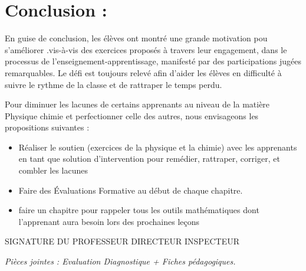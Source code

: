 \documentclass[12pt]{article}
\begin{document}
\section*{Conclusion : }
\hspace{2cm}En guise de conclusion, les élèves ont  montré  une grande motivation  pou s’améliorer .vis-à-vis des exercices proposés à travers leur engagement, dans le processus de l’enseignement-apprentissage, manifesté par des participations jugées remarquables. Le défi est toujours relevé afin d’aider les élèves en difficulté à suivre le rythme de la classe et de rattraper le temps perdu.

 Pour diminuer les lacunes de certains apprenants au niveau de la matière Physique chimie et perfectionner celle des autres, nous envisageons les propositions suivantes : 
 \begin{itemize}
	 \item Réaliser le soutien (exercices de la physique et la chimie) avec les apprenants en tant que solution d’intervention pour remédier, rattraper, corriger, et combler les lacunes
	 \item Faire des Évaluations Formative au début de chaque chapitre.
	 \item faire un chapitre pour rappeler tous les outils mathématiques dont l’apprenant aura besoin lors des prochaines leçons 

 \end{itemize}

 \vspace{9cm}
 SIGNATURE DU PROFESSEUR \hspace{3cm} DIRECTEUR  \hspace{3cm} INSPECTEUR

 \vspace{6cm}
\emph{Pièces jointes : Evaluation Diagnostique + Fiches pédagogiques.}
\end{document}
